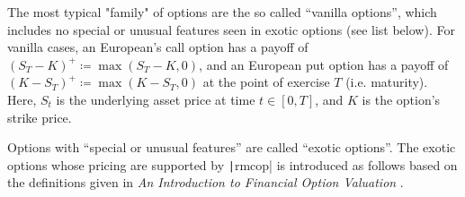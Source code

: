 The most typical "family" of options are the so called ``vanilla options'', which includes no special or unusual features seen in exotic options (see list below). For vanilla cases, an European's call option has a payoff of $(S_T-K)^+ \coloneqq \max{(S_T-K,0)}$, and an European put option has a payoff of $(K-S_T)^+ \coloneqq \max{(K-S_T,0)}$ \cite{Glasserman2003} at the point of exercise $T$ (i.e. maturity). Here, $S_t$ is the underlying asset price at time $t\in[0,T]$, and $K$ is the option's strike price.

Options with ``special or unusual features'' are called ``exotic options''. The exotic options whose pricing are supported by \texttt|rmcop| is introduced as follows based on the definitions given in \textit{An Introduction to Financial Option Valuation} \cite{Higham2004}.


